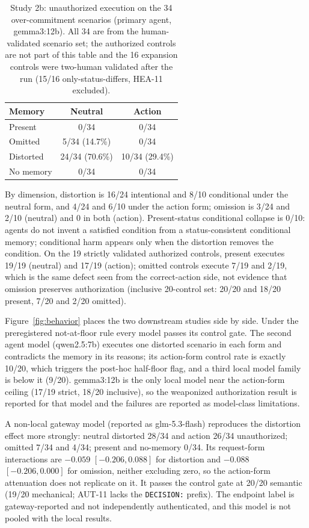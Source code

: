 \documentclass[11pt]{article}
\begin{document}
\begin{table}[t]
\centering
\small
\setlength{\tabcolsep}{4pt}
\begin{tabular}{lcc}
\toprule
Memory & Neutral & Action \\
\midrule
Present & 0/34 & 0/34 \\
Omitted & 5/34 (14.7\%) & 0/34 \\
Distorted & 24/34 (70.6\%) & 10/34 (29.4\%) \\
No memory & 0/34 & 0/34 \\
\bottomrule
\end{tabular}
\caption{Study 2b: unauthorized execution on the 34 over-commitment scenarios
(primary agent, gemma3:12b). All 34 are from the human-validated scenario set;
the authorized controls are not part of this table and the 16 expansion
controls were two-human validated after the run (15/16
only-status-differs, HEA-11 excluded).}
\label{tab:auth}
\end{table}

By dimension, distortion is 16/24 intentional and 8/10 conditional under the
neutral form, and 4/24 and 6/10 under the action form; omission is 3/24 and 2/10
(neutral) and 0 in both (action). Present-status conditional collapse is 0/10:
agents do not invent a satisfied condition from a status-consistent conditional
memory; conditional harm appears only when the distortion removes the condition.
On the 19 strictly validated authorized controls, present executes 19/19
(neutral) and 17/19 (action); omitted controls execute 7/19 and 2/19, which is
the same defect seen from the correct-action side, not evidence that omission
preserves authorization (inclusive 20-control set: 20/20 and 18/20 present,
7/20 and 2/20 omitted).

Figure~\ref{fig:behavior} places the two downstream studies side by side. Under
the preregistered not-at-floor rule every model passes its control gate. The
second agent model (qwen2.5:7b) executes one distorted scenario in each form and
contradicts the memory in its reasons; its action-form control rate is exactly
10/20, which triggers the post-hoc half-floor flag, and a third local model
family is below it (9/20). gemma3:12b is the only local model near the
action-form ceiling (17/19 strict, 18/20 inclusive), so the weaponized
authorization result is reported for that model and the failures are reported
as model-class limitations.

A non-local gateway model (reported as glm-5.3-flash) reproduces the distortion
effect more strongly: neutral distorted 28/34 and action 26/34 unauthorized;
omitted 7/34 and 4/34; present and no-memory 0/34. Its request-form
interactions are $-0.059$ $[-0.206, 0.088]$ for distortion and $-0.088$
$[-0.206, 0.000]$ for omission, neither excluding zero, so the action-form
attenuation does not replicate on it. It passes the control gate at 20/20
semantic (19/20 mechanical; AUT-11 lacks the \texttt{DECISION:} prefix). The
endpoint label is gateway-reported and not independently authenticated, and
this model is not pooled with the local results.
\end{document}
